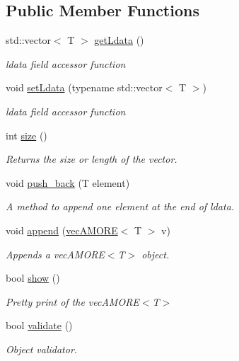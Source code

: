 \subsection*{Public Member Functions}
\begin{DoxyCompactItemize}
\item 
std::vector$<$ T $>$ \hyperlink{classvec_a_m_o_r_e_a5bb6985476d120ede398361b317b0b95}{getLdata} ()
\begin{DoxyCompactList}\small\item\em ldata field accessor function \end{DoxyCompactList}\item 
void \hyperlink{classvec_a_m_o_r_e_a13768303bf31bf7065a98015c00abc9f}{setLdata} (typename std::vector$<$ T $>$)
\begin{DoxyCompactList}\small\item\em ldata field accessor function \end{DoxyCompactList}\item 
int \hyperlink{classvec_a_m_o_r_e_ae1289a7870dbdd19b6455a890e94ce48}{size} ()
\begin{DoxyCompactList}\small\item\em Returns the size or length of the vector. \end{DoxyCompactList}\item 
void \hyperlink{classvec_a_m_o_r_e_a2472d46a111328c069cdb48e7e41109b}{push\_\-back} (T element)
\begin{DoxyCompactList}\small\item\em A method to append one element at the end of ldata. \end{DoxyCompactList}\item 
void \hyperlink{classvec_a_m_o_r_e_ab060ffa67e85997fc4236bedfd2f17b6}{append} (\hyperlink{classvec_a_m_o_r_e}{vecAMORE}$<$ T $>$ v)
\begin{DoxyCompactList}\small\item\em Appends a vecAMORE$<$T$>$ object. \end{DoxyCompactList}\item 
bool \hyperlink{classvec_a_m_o_r_e_a11b0ffb0d2481f1960cb49a26b227d37}{show} ()
\begin{DoxyCompactList}\small\item\em Pretty print of the vecAMORE$<$T$>$ \end{DoxyCompactList}\item 
bool \hyperlink{classvec_a_m_o_r_e_a247aaafe9115cc433fc3be297c1f568e}{validate} ()
\begin{DoxyCompactList}\small\item\em Object validator. \end{DoxyCompactList}\end{DoxyCompactItemize}
